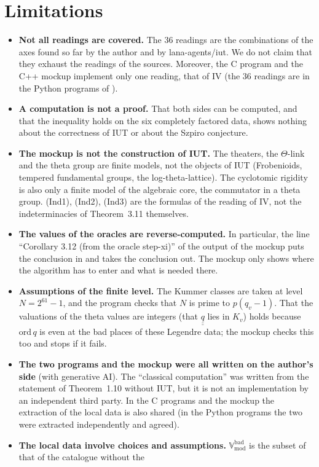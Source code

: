 \documentclass[11pt,a4paper]{article}
\newcommand{\Vbad}{\mathbb{V}_{\mathrm{mod}}^{\mathrm{bad}}}
\newcommand{\qq}{\underline{\underline{q}}}
\begin{document}
\section{Limitations}
\begin{itemize}
\item \textbf{Not all readings are covered.} The 36 readings are the combinations of the axes found so far by the author
and by lana-agents/iut. We do not claim that they exhaust the readings of the sources. Moreover, the C program and the C++ mockup
implement only one reading, that of IV (the 36 readings are in the Python programs of \cite{RF}).
\item \textbf{A computation is not a proof.} That both sides can be computed, and that the inequality holds on the six
completely factored data, shows nothing about the correctness of IUT or about the Szpiro conjecture.
\item \textbf{The mockup is not the construction of IUT.} The theaters, the $\Theta$-link and the theta group are finite
models, not the objects of IUT (Frobenioids, tempered fundamental groups, the log-theta-lattice). The cyclotomic rigidity
is also only a finite model of the algebraic core, the commutator in a theta group. (Ind1), (Ind2), (Ind3) are the
formulas of the reading of IV, not the indeterminacies of Theorem~3.11 themselves.
\item \textbf{The values of the oracles are reverse-computed.} In particular, the line ``Corollary 3.12 (from the oracle
step-xi)'' of the output of the mockup puts the conclusion in and takes the conclusion out. The mockup only shows where
the algorithm has to enter and what is needed there.
\item \textbf{Assumptions of the finite level.} The Kummer classes are taken at level $N=2^{61}-1$, and the program checks
that $N$ is prime to $p(q_v-1)$. That the valuations of the theta values are integers (that $\qq$ lies in $K_v$) holds
because $\mathrm{ord}\,q$ is even at the bad places of these Legendre data; the mockup checks this too and stops if it
fails.
\item \textbf{The two programs and the mockup were all written on the author's side} (with generative AI). The
``classical computation'' was written from the statement of Theorem~1.10 without IUT, but it is not an implementation by
an independent third party. In the C programs and the mockup the extraction of the local data is also shared (in the
Python programs the two were extracted independently and agreed).
\item \textbf{The local data involve choices and assumptions.} $\Vbad$ is the subset of that of the catalogue without the

\end{itemize}
\end{document}

